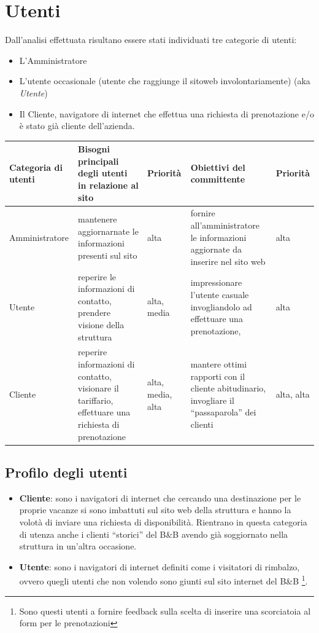 \documentclass[a4paper,12pt,hidelinks]{report}
\begin{document}
\section{Utenti}
  Dall'analisi effettuata risultano essere stati individuati tre categorie di utenti:
  \begin{itemize}
    \item L'Amministratore
    \item L'utente occasionale (utente che raggiunge il sitoweb involontariamente) (aka \textit{Utente})
    \item Il Cliente, navigatore di internet che effettua una richiesta di prenotazione e/o è stato già cliente dell'azienda.
  \end{itemize}
  \begin{center}
    \begin{tabular}{||m{3cm}||m{4cm}|m{}||m{4cm}|m{}||}
      \hline
	\textbf{Categoria di utenti} & \textbf{Bisogni principali degli utenti in relazione al sito} & Priorità & \textbf{Obiettivi del committente} & Priorità \\
      \hline
	Amministratore & mantenere aggiornarnate le informazioni presenti sul sito & alta 
	& fornire all'amministratore le informazioni aggiornate da inserire nel sito web & alta\\
      \hline
	Utente & reperire le informazioni di contatto, prendere visione della struttura & alta, media
	      & impressionare l'utente casuale invogliandolo ad effettuare una prenotazione,  & alta\\
      \hline  
	Cliente & reperire informazioni di contatto, visionare il tariffario, effettuare una richiesta di prenotazione & alta, media, alta & mantere ottimi rapporti con
	il cliente abitudinario, invogliare il ``passaparola'' dei clienti & alta, alta\\
      \hline
    \end{tabular}
  \end{center}
  \subsection{Profilo degli utenti}
    \begin{itemize}
    \item \textbf{Cliente}: sono i navigatori di internet che cercando una destinazione per le proprie vacanze si sono imbattuti sul sito web della struttura 
    e hanno la volotà di inviare una richiesta di disponibilità. 
    Rientrano in questa categoria di utenza anche i clienti ``storici'' del B\&B avendo già soggiornato nella struttura in un'altra occasione.
    \item \textbf{Utente}: sono i navigatori di internet definiti come i visitatori di rimbalzo, ovvero quegli utenti che non volendo sono giunti sul sito 
    internet del B\&B \footnote{Sono questi utenti a fornire feedback sulla scelta di inserire una scorciatoia al form per le prenotazioni}.
    \end{itemize}
\end{document}

